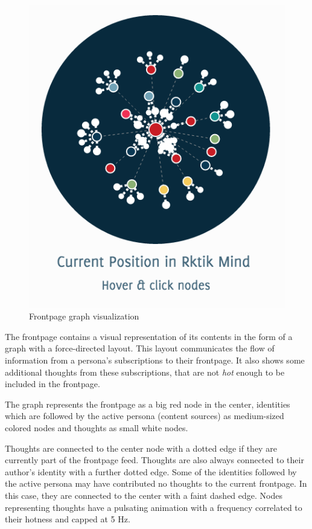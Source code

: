 \begin{figure}[htbp]
\centering
\includegraphics{img/graph.png}
\caption{Frontpage graph visualization}
\end{figure}

The frontpage contains a visual representation of its contents in the
form of a graph with a force-directed layout. This layout communicates
the flow of information from a persona's subscriptions to their
frontpage. It also shows some additional thoughts from these
subscriptions, that are not \emph{hot} enough to be included in the
frontpage.

The graph represents the frontpage as a big red node in the center,
identities which are followed by the active persona (content sources) as
medium-sized colored nodes and thoughts as small white nodes.

Thoughts are connected to the center node with a dotted edge if they are
currently part of the frontpage feed. Thoughts are also always connected
to their author's identity with a further dotted edge. Some of the
identities followed by the active persona may have contributed no
thoughts to the current frontpage. In this case, they are connected to
the center with a faint dashed edge. Nodes representing thoughts have a
pulsating animation with a frequency correlated to their hotness and
capped at 5 Hz.

